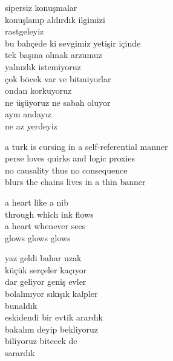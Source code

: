 \documentclass[10pt, openright, oneside]{memoir}
\theoremstyle{definition}
\begin{document}
\settowidth{\versewidth}{bu bahçede ki sevgimiz yetişir içinde}
\begin{cverse}
  sipersiz konuşmalar \\
  konuşlanıp aldırdık ilgimizi \\
  rastgeleyiz \\
  bu bahçede ki sevgimiz yetişir içinde \\
  tek başına olmak arzumuz \\
  yalnızlık istemiyoruz \\
  çok böcek var ve bitmiyorlar \\
  ondan korkuyoruz \\
  ne üşüyoruz ne sabah oluyor \\
  aynı andayız \\
  ne az yerdeyiz \\
\end{cverse}
\vspace*{\fill}
%
\newpage
{}
\vspace*{\fill}
\settowidth{\versewidth}{a turk is cursing in a self-referential manner}
\begin{cverse}
  a turk is cursing in a self-referential manner \\
  perse loves quirks and logic proxies \\
  no causality thus no consequence \\
  blurs the chains lives in a thin banner \\
\end{cverse}
\vspace*{\fill}
%
\newpage
{}
\vspace*{\fill}
\settowidth{\versewidth}{through which ink flows}
\begin{cverse}
  a heart like a nib \\
  through which ink flows \\
  a heart whenever sees \\
  glows glows glows \\
\end{cverse}
\vspace*{\fill}
%
\newpage
{}
\vspace*{\fill}
\settowidth{\versewidth}{eskidendi bir evtik arardık}
\begin{cverse}
  yaz geldi bahar uzak \\
  küçük serçeler kaçıyor \\
  dar geliyor geniş evler \\
  bolalmıyor sıkışık kalpler \\
  bunaldık \\
  eskidendi bir evtik arardık \\
  bakalım deyip bekliyoruz \\
  biliyoruz bitecek de \\
  sarardık \\
\end{cverse}
\end{document}
